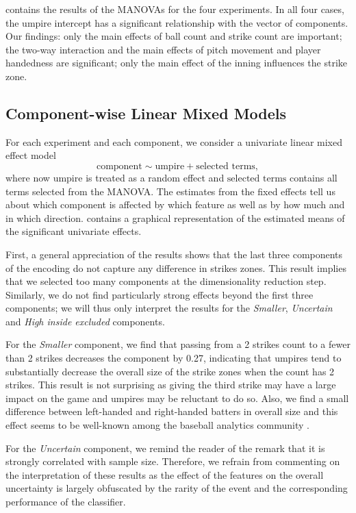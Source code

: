 \documentclass[letterpaper,12pt]{article}
\begin{document}
 contains the results of the MANOVAs for the four experiments. In all four cases, the umpire intercept has a significant relationship with the vector of components. Our findings: only the main effects of ball count and strike count are important; the two-way interaction and the main effects of pitch movement and player handedness are significant; only the main effect of the inning influences the strike zone.





\subsection{Component-wise Linear Mixed Models}\label{sec:LME}

For each experiment and each component, we consider a univariate linear mixed effect model
\[
    \text{component}
    \sim
    \text{umpire} + \text{selected terms},
\]
where now $\text{umpire}$ is treated as a random effect and $\text{selected terms}$ contains all terms selected from the MANOVA. The estimates from the fixed effects tell us about which component is affected by which feature as well as by how much and in which direction. 
 contains a graphical representation of the estimated means of the significant univariate effects. 

First, a general appreciation of the results shows that the last three components of the encoding do not capture any difference in strikes zones. 
This result implies that we selected too many components at the dimensionality reduction step. 
Similarly, we do not find particularly strong effects beyond the first three components; we will thus only interpret the results for the \textit{Smaller}, \textit{Uncertain} and \textit{High inside excluded} components.

For the \textit{Smaller} component, we find that passing from a 2 strikes count to a fewer than 2 strikes decreases the component by \num{0.27}, indicating that umpires tend to substantially decrease the overall size of the strike zones when the count has 2 strikes. 
This result is not surprising as giving the third strike may have a large impact on the game and umpires may be reluctant to do so.
Also, we find a small difference between left-handed and right-handed batters in overall size and this effect seems to be well-known among the baseball analytics community \cite{lefty-zone}.

For the \textit{Uncertain} component, we remind the reader of the remark that it is strongly correlated with sample size.
Therefore, we refrain from commenting on the interpretation of these results as the effect of the features on the overall uncertainty is largely obfuscated by the rarity of the event and the corresponding performance of the classifier.
\end{document}
